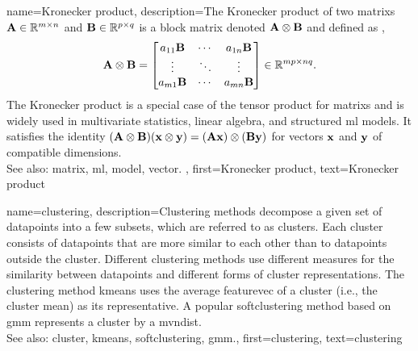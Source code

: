 {name={Kronecker product}, 
	description={The Kronecker product  of two \glspl{matrix} ${\bf A} \in \mathbb{R}^{m \times n}$ 
		and ${\bf B} \in \mathbb{R}^{p \times q}$ is a block \gls{matrix} denoted ${\bf A} \otimes {\bf B}$ 
	 	and defined as \cite{GolubVanLoanBook}, \cite{HornMatAnalysis}
    		\[
      		{\bf A} \otimes {\bf B} =
      		\begin{bmatrix}
        		a_{11}{\bf B} & \cdots & a_{1n}{\bf B} \\
        		\vdots & \ddots & \vdots \\
        		a_{m1}{\bf B} & \cdots & a_{mn}{\bf B}
      		\end{bmatrix}
      		\in \mathbb{R}^{mp \times nq}.
    		\]
    		The Kronecker product is a special case of the tensor product for \glspl{matrix} and is 
		widely used in multivariate statistics, linear algebra, and structured \gls{ml} \glspl{model}. 
		It satisfies the identity $({\bf A} \otimes {\bf B})({\bf x} \otimes {\bf y}) = ({\bf A}{\bf x}) \otimes ({\bf B}{\bf y})$ 
		for \glspl{vector} ${\bf x}$ and ${\bf y}$ of compatible dimensions.
		\\
		See also: \gls{matrix}, \gls{ml}, \gls{model}, \gls{vector}. },
	first={Kronecker product},
	text={Kronecker product} 
}
	
{name={clustering}, 
	description={Clustering methods decompose a given 
		set of \glspl{datapoint} into a few subsets, which are referred to as \glspl{cluster}. 
		Each \gls{cluster} consists of \glspl{datapoint} that are more similar to each 
		other than to \glspl{datapoint} outside the \gls{cluster}. Different clustering methods 
		use different measures for the similarity between \glspl{datapoint} and different 
		forms of \gls{cluster} representations. The clustering method \gls{kmeans} uses the 
		average \gls{featurevec} of a \gls{cluster} (i.e., the \gls{cluster} \gls{mean}) as its representative. 
		A popular \gls{softclustering} method based on \gls{gmm} represents 
		a \gls{cluster} by a \gls{mvndist}.
				\\
		See also: \gls{cluster}, \gls{kmeans}, \gls{softclustering}, \gls{gmm}.},
	first={clustering},
	text={clustering} 
}
	
